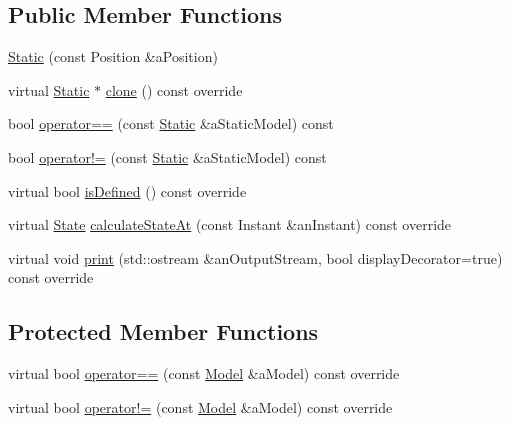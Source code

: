 \subsection*{Public Member Functions}
\begin{DoxyCompactItemize}
\item 
\hyperlink{classlibrary_1_1astro_1_1trajectory_1_1models_1_1_static_a9d0fc36702a4c78adddc06f8490c83c8}{Static} (const Position \&a\+Position)
\item 
virtual \hyperlink{classlibrary_1_1astro_1_1trajectory_1_1models_1_1_static}{Static} $\ast$ \hyperlink{classlibrary_1_1astro_1_1trajectory_1_1models_1_1_static_a3586bbfdd6fc3958b18a2ffcb3b23fd4}{clone} () const override
\item 
bool \hyperlink{classlibrary_1_1astro_1_1trajectory_1_1models_1_1_static_a9d2238a23ea6666334aece4d3ee04b40}{operator==} (const \hyperlink{classlibrary_1_1astro_1_1trajectory_1_1models_1_1_static}{Static} \&a\+Static\+Model) const
\item 
bool \hyperlink{classlibrary_1_1astro_1_1trajectory_1_1models_1_1_static_a115fe6692bc0946eec93fcf15d382bb4}{operator!=} (const \hyperlink{classlibrary_1_1astro_1_1trajectory_1_1models_1_1_static}{Static} \&a\+Static\+Model) const
\item 
virtual bool \hyperlink{classlibrary_1_1astro_1_1trajectory_1_1models_1_1_static_a41449e98bb076e0601df67b1cfbff6b8}{is\+Defined} () const override
\item 
virtual \hyperlink{classlibrary_1_1astro_1_1trajectory_1_1_state}{State} \hyperlink{classlibrary_1_1astro_1_1trajectory_1_1models_1_1_static_ae4bc6aceab498868e4ebe2a65c6aa413}{calculate\+State\+At} (const Instant \&an\+Instant) const override
\item 
virtual void \hyperlink{classlibrary_1_1astro_1_1trajectory_1_1models_1_1_static_af8f9c6fa6ae2d4471868cc970e1ef571}{print} (std\+::ostream \&an\+Output\+Stream, bool display\+Decorator=true) const override
\end{DoxyCompactItemize}
\subsection*{Protected Member Functions}
\begin{DoxyCompactItemize}
\item 
virtual bool \hyperlink{classlibrary_1_1astro_1_1trajectory_1_1models_1_1_static_ade92be03b036c9625bd5a4111cb69731}{operator==} (const \hyperlink{classlibrary_1_1astro_1_1trajectory_1_1_model}{Model} \&a\+Model) const override
\item 
virtual bool \hyperlink{classlibrary_1_1astro_1_1trajectory_1_1models_1_1_static_aadcfd4ac66cc3fc4cc2b868b9bbc182a}{operator!=} (const \hyperlink{classlibrary_1_1astro_1_1trajectory_1_1_model}{Model} \&a\+Model) const override
\end{DoxyCompactItemize}

